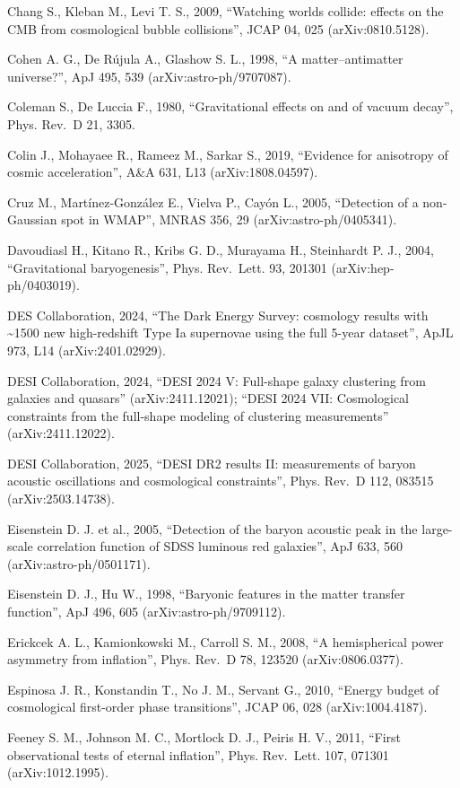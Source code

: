 \documentclass[
  11pt,
]{article}
\begin{document}
Chang S., Kleban M., Levi T. S., 2009, ``Watching worlds collide:
effects on the CMB from cosmological bubble collisions'', JCAP 04, 025
(arXiv:0810.5128).

Cohen A. G., De Rújula A., Glashow S. L., 1998, ``A matter--antimatter
universe?'', ApJ 495, 539 (arXiv:astro-ph/9707087).

Coleman S., De Luccia F., 1980, ``Gravitational effects on and of vacuum
decay'', Phys. Rev.~D 21, 3305.

Colin J., Mohayaee R., Rameez M., Sarkar S., 2019, ``Evidence for
anisotropy of cosmic acceleration'', A\&A 631, L13 (arXiv:1808.04597).

Cruz M., Martínez-González E., Vielva P., Cayón L., 2005, ``Detection of
a non-Gaussian spot in WMAP'', MNRAS 356, 29 (arXiv:astro-ph/0405341).

Davoudiasl H., Kitano R., Kribs G. D., Murayama H., Steinhardt P. J.,
2004, ``Gravitational baryogenesis'', Phys. Rev.~Lett. 93, 201301
(arXiv:hep-ph/0403019).

DES Collaboration, 2024, ``The Dark Energy Survey: cosmology results
with \textasciitilde1500 new high-redshift Type Ia supernovae using the
full 5-year dataset'', ApJL 973, L14 (arXiv:2401.02929).

DESI Collaboration, 2024, ``DESI 2024 V: Full-shape galaxy clustering
from galaxies and quasars'' (arXiv:2411.12021); ``DESI 2024 VII:
Cosmological constraints from the full-shape modeling of clustering
measurements'' (arXiv:2411.12022).

DESI Collaboration, 2025, ``DESI DR2 results II: measurements of baryon
acoustic oscillations and cosmological constraints'', Phys. Rev.~D 112,
083515 (arXiv:2503.14738).

Eisenstein D. J. et al., 2005, ``Detection of the baryon acoustic peak
in the large-scale correlation function of SDSS luminous red galaxies'',
ApJ 633, 560 (arXiv:astro-ph/0501171).

Eisenstein D. J., Hu W., 1998, ``Baryonic features in the matter
transfer function'', ApJ 496, 605 (arXiv:astro-ph/9709112).

Erickcek A. L., Kamionkowski M., Carroll S. M., 2008, ``A hemispherical
power asymmetry from inflation'', Phys. Rev.~D 78, 123520
(arXiv:0806.0377).

Espinosa J. R., Konstandin T., No J. M., Servant G., 2010, ``Energy
budget of cosmological first-order phase transitions'', JCAP 06, 028
(arXiv:1004.4187).

Feeney S. M., Johnson M. C., Mortlock D. J., Peiris H. V., 2011, ``First
observational tests of eternal inflation'', Phys. Rev.~Lett. 107, 071301
(arXiv:1012.1995).
\end{document}
